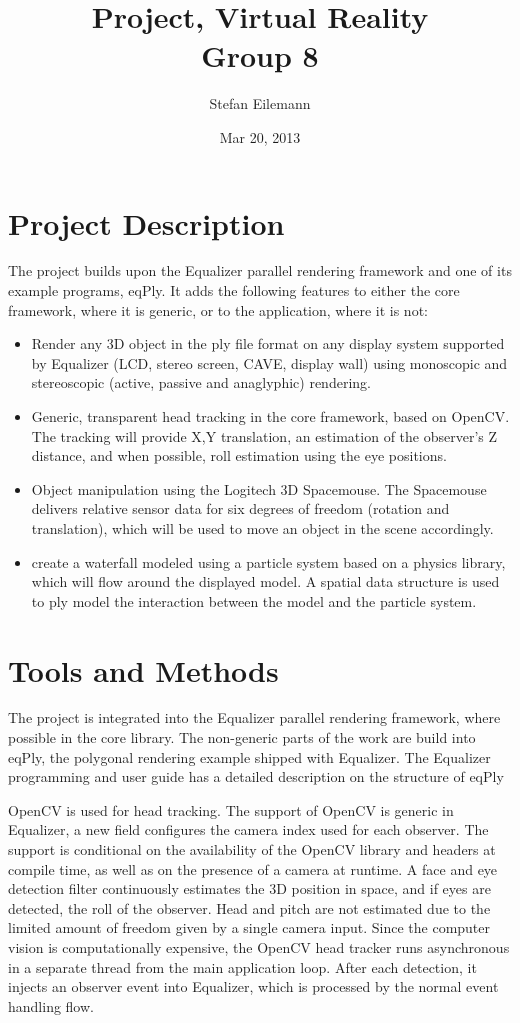\documentclass[10pt,a4]{scrartcl}
\title{Project, Virtual Reality\\Group 8}
\author{Stefan Eilemann}
\date{Mar 20, 2013}
\begin{document}
\maketitle

\section{Project Description}

The project builds upon the Equalizer parallel rendering framework and one of
its example programs, eqPly. It adds the following features to either the
core framework, where it is generic, or to the application, where it is not:
\begin{itemize}
\item Render any 3D object in the ply file format on any display system
  supported by Equalizer (LCD, stereo screen, CAVE, display wall) using
  monoscopic and stereoscopic (active, passive and anaglyphic) rendering.
\item Generic, transparent head tracking in the core framework, based on
  OpenCV. The tracking will provide X,Y translation, an estimation of the
  observer's Z distance, and when possible, roll estimation using the eye
  positions.
\item Object manipulation using the Logitech 3D Spacemouse. The Spacemouse
  delivers relative sensor data for six degrees of freedom (rotation and
  translation), which will be used to move an object in the scene accordingly.
\item create a waterfall modeled using a particle system based on a physics
  library, which will flow around the displayed model. A spatial data structure
  is used to ply model the interaction between the model and the particle
  system.
\end{itemize}

\section{Tools and Methods}

The project is integrated into the Equalizer parallel rendering framework, where
possible in the core library. The non-generic parts of the work are build into
\textsf{eqPly}, the polygonal rendering example shipped with Equalizer. The
Equalizer programming and user guide has a detailed description on the structure
of \textsf{eqPly}

OpenCV is used for head tracking. The support of OpenCV is generic in Equalizer,
a new field configures the camera index used for each observer. The support is
conditional on the availability of the OpenCV library and headers at compile
time, as well as on the presence of a camera at runtime. A face and eye
detection filter continuously estimates the 3D position in space, and if eyes
are detected, the roll of the observer. Head and pitch are not estimated due to
the limited amount of freedom given by a single camera input. Since the computer
vision is computationally expensive, the OpenCV head tracker runs asynchronous
in a separate thread from the main application loop. After each detection, it
injects an observer event into Equalizer, which is processed by the normal event
handling flow.
\end{document}
